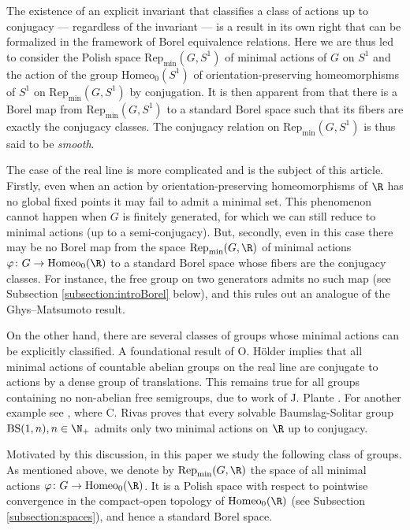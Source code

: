 \documentclass[reqno]{amsart}
\begin{document}
 The existence of an explicit invariant that classifies a class of actions up to conjugacy --- regardless of the invariant --- is a result in its own right that can be formalized in the framework of Borel equivalence relations. Here we are thus led to consider the Polish space $\mathrm{Rep}_\mathrm{min}(G, S^1)$ of minimal actions of $G$ on $S^1$ and the action of the group $\mathrm{Homeo}_0(S^1)$ of orientation-preserving homeomorphisms of $S^1$ on $\mathrm{Rep}_\mathrm{min}(G,S^1)$ by conjugation. 
It is then apparent from \cite{Matsumoto1986} that there is a Borel map from $\mathrm{Rep}_\mathrm{min}(G, S^1)$ to a standard Borel space such that its fibers are exactly the conjugacy classes. The conjugacy relation on $\mathrm{Rep}_\mathrm{min}(G, S^1)$ is thus said to be \emph{smooth}.

The case of the real line is more complicated and is the subject of this article. Firstly, even when an action by orientation-preserving homeomorphisms of $\R$ has no global fixed points it may fail to admit a minimal set. This phenomenon cannot happen when $G$ is finitely generated, for which we can still reduce to minimal actions (up to a semi-conjugacy). But, secondly, even  in this case there may be no Borel map from the space $\mathrm{Rep}_\mathrm{min}(G, \R)$ of minimal actions  $\varphi\colon G\to \mathrm{Homeo}_0(\R)$ to a standard Borel space whose fibers are the conjugacy classes. For instance, the free group on two generators admits no such map (see Subsection \ref{subsection:introBorel} below), and this rules out an analogue of the Ghys--Matsumoto result. 

On the other hand, there are several classes of groups whose minimal actions can be explicitly classified. A foundational result of O. Hölder \cite{Holder1901} implies that all minimal actions of countable abelian groups on the real line are conjugate to actions by a dense group of translations. This remains true for all groups containing no non-abelian free semigroups, due to work of J. Plante \cite{Plante1975}. For another example see \cite{Rivas2010}, where C. Rivas proves that every solvable Baumslag-Solitar group $\mathrm{BS}(1,n), n \in \N_+$ admits only two minimal actions on $\R$ up to conjugacy.


Motivated by this discussion, in this paper we study the following class of groups. As mentioned above, we denote by $\mathrm{Rep}_\mathrm{min}(G, \R)$ the space of all minimal actions $\varphi\colon G\to \mathrm{Homeo}_0(\R)$. It is a Polish space with respect to pointwise convergence in the compact-open topology of $\mathrm{Homeo}_0(\R)$ (see Subsection \ref{subsection:spaces}), and hence a standard Borel space. 
\end{document}
